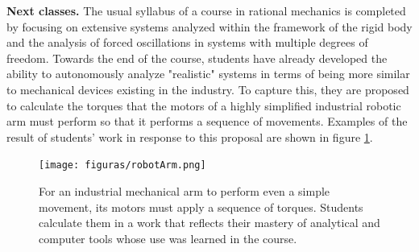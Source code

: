 


\textbf{Next classes.} The usual syllabus of a course in rational mechanics is completed by focusing on extensive systems analyzed within the framework of the rigid body and the analysis of forced oscillations in systems with multiple degrees of freedom. Towards the end of the course, students have already developed the ability to autonomously analyze "realistic" systems in terms of being more similar to mechanical devices existing in the industry. To capture this, they are proposed to calculate the torques that the motors of a highly simplified industrial robotic arm must perform so that it performs a sequence of movements. Examples of the result of students' work in response to this proposal are shown in figure \ref{fig:robotarm}.

\begin{figure}[!ht]
\centering
\texttt{[image: figuras/robotArm.png]}
\caption{For an industrial mechanical arm to perform even a simple movement, its motors must apply a sequence of torques. Students calculate them in a work that reflects their mastery of analytical and computer tools whose use was learned in the course.}
\label{fig:robotarm}
\end{figure}
